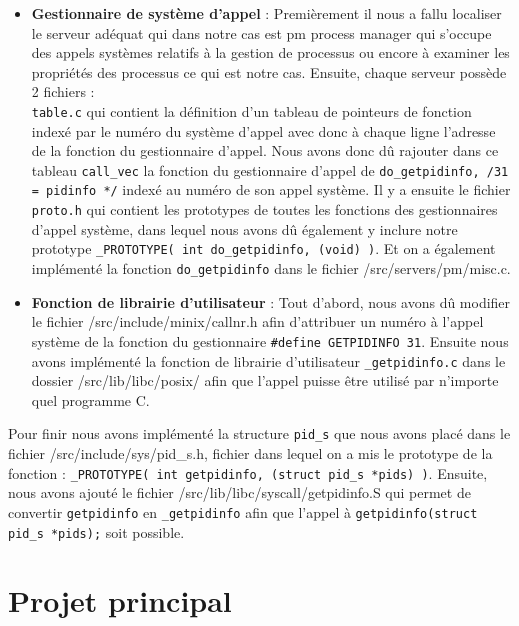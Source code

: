 \documentclass[10pt, onecolumn] {IEEEtran}
\begin{document}
\begin{itemize}
\item \textbf{Gestionnaire de système d'appel} : Premièrement il nous a fallu localiser le serveur adéquat qui dans notre cas est pm \og process manager \fg qui s'occupe des appels systèmes relatifs à la gestion de processus ou encore à examiner les propriétés des processus ce qui est notre cas. Ensuite, chaque serveur possède 2 fichiers : \\ \texttt{table.c} qui contient la définition d'un tableau de pointeurs de fonction indexé par le numéro du système d'appel avec donc à chaque ligne l'adresse de la fonction du gestionnaire d'appel. Nous avons donc dû rajouter dans ce tableau \texttt{call\_vec} la fonction du gestionnaire d'appel de \texttt{do\_getpidinfo,	\slash* 31 = pidinfo	*\slash} indexé au numéro de son appel système. Il y a ensuite le fichier  \texttt{proto.h} qui contient les prototypes de toutes les fonctions des gestionnaires d'appel système, dans lequel nous avons dû également y inclure notre prototype \texttt{\_PROTOTYPE( int do\_getpidinfo, (void)					)}. Et on a également implémenté la fonction  \texttt{do\_getpidinfo} dans le fichier /src/servers/pm/misc.c.\\

\item \textbf{Fonction de librairie d'utilisateur} : Tout d'abord, nous avons dû modifier le fichier /src/include/minix/callnr.h afin d'attribuer un numéro à l'appel système de la fonction du gestionnaire \texttt{\#define GETPIDINFO 31}. Ensuite nous avons implémenté la fonction de librairie d'utilisateur \texttt{\_getpidinfo.c} dans le dossier /src/lib/libc/posix/ afin que l'appel puisse être utilisé par n'importe quel programme C.  \\
\end{itemize}

Pour finir nous avons implémenté la structure \texttt{pid\_s} que nous avons placé dans le fichier /src/include/sys/pid\_s.h, fichier dans lequel on a mis le prototype de la fonction : \texttt{\_PROTOTYPE( int getpidinfo, (struct pid\_s *pids)            )}. Ensuite, nous avons ajouté le fichier /src/lib/libc/syscall/getpidinfo.S qui permet de convertir \texttt{getpidinfo} en  \texttt{\_getpidinfo} afin que l'appel à \texttt{getpidinfo(struct pid\_s *pids);} soit possible. 

\newpage
\section{Projet principal}
\end{document}
